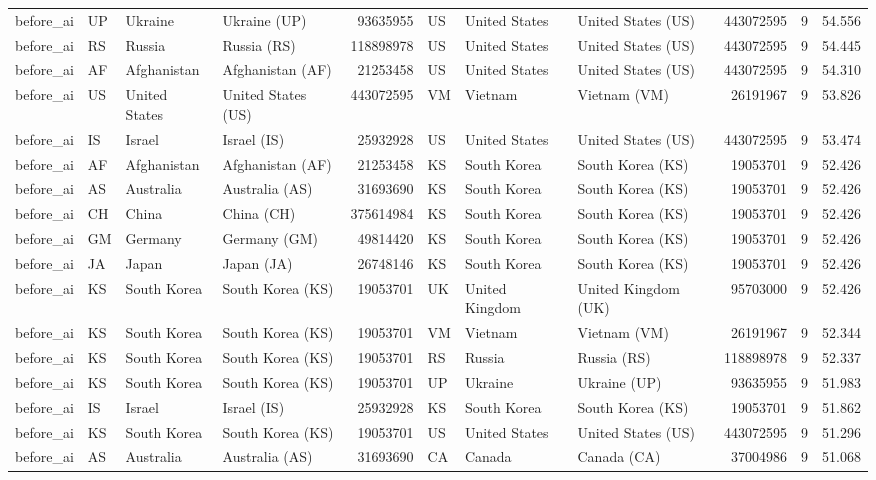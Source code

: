 \begin{tabular}{llllrlllrrr}
before\_ai & UP & Ukraine & Ukraine (UP) & 93635955 & US & United States & United States (US) & 443072595 & 9 & 54.556 \\
before\_ai & RS & Russia & Russia (RS) & 118898978 & US & United States & United States (US) & 443072595 & 9 & 54.445 \\
before\_ai & AF & Afghanistan & Afghanistan (AF) & 21253458 & US & United States & United States (US) & 443072595 & 9 & 54.310 \\
before\_ai & US & United States & United States (US) & 443072595 & VM & Vietnam & Vietnam (VM) & 26191967 & 9 & 53.826 \\
before\_ai & IS & Israel & Israel (IS) & 25932928 & US & United States & United States (US) & 443072595 & 9 & 53.474 \\
before\_ai & AF & Afghanistan & Afghanistan (AF) & 21253458 & KS & South Korea & South Korea (KS) & 19053701 & 9 & 52.426 \\
before\_ai & AS & Australia & Australia (AS) & 31693690 & KS & South Korea & South Korea (KS) & 19053701 & 9 & 52.426 \\
before\_ai & CH & China & China (CH) & 375614984 & KS & South Korea & South Korea (KS) & 19053701 & 9 & 52.426 \\
before\_ai & GM & Germany & Germany (GM) & 49814420 & KS & South Korea & South Korea (KS) & 19053701 & 9 & 52.426 \\
before\_ai & JA & Japan & Japan (JA) & 26748146 & KS & South Korea & South Korea (KS) & 19053701 & 9 & 52.426 \\
before\_ai & KS & South Korea & South Korea (KS) & 19053701 & UK & United Kingdom & United Kingdom (UK) & 95703000 & 9 & 52.426 \\
before\_ai & KS & South Korea & South Korea (KS) & 19053701 & VM & Vietnam & Vietnam (VM) & 26191967 & 9 & 52.344 \\
before\_ai & KS & South Korea & South Korea (KS) & 19053701 & RS & Russia & Russia (RS) & 118898978 & 9 & 52.337 \\
before\_ai & KS & South Korea & South Korea (KS) & 19053701 & UP & Ukraine & Ukraine (UP) & 93635955 & 9 & 51.983 \\
before\_ai & IS & Israel & Israel (IS) & 25932928 & KS & South Korea & South Korea (KS) & 19053701 & 9 & 51.862 \\
before\_ai & KS & South Korea & South Korea (KS) & 19053701 & US & United States & United States (US) & 443072595 & 9 & 51.296 \\
before\_ai & AS & Australia & Australia (AS) & 31693690 & CA & Canada & Canada (CA) & 37004986 & 9 & 51.068 \\

\end{tabular}
